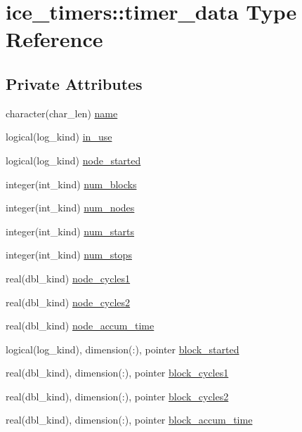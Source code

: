 \hypertarget{typeice__timers_1_1timer__data}{
\section{ice\_\-timers::timer\_\-data Type Reference}
\label{typeice__timers_1_1timer__data}
}
\subsection*{Private Attributes}
\begin{DoxyCompactItemize}
\item 
character(char\_\-len) \hyperlink{typeice__timers_1_1timer__data_a44015dd67659a3714d03f5a79752afc8}{name}
\item 
logical(log\_\-kind) \hyperlink{typeice__timers_1_1timer__data_af1c29a0086c412b4ed465ee606c479ea}{in\_\-use}
\item 
logical(log\_\-kind) \hyperlink{typeice__timers_1_1timer__data_a6a6b881e84dfd7cbfb6ccffd1b1e65a1}{node\_\-started}
\item 
integer(int\_\-kind) \hyperlink{typeice__timers_1_1timer__data_a8a3b41c5452006ccf1ea62b0f47c6246}{num\_\-blocks}
\item 
integer(int\_\-kind) \hyperlink{typeice__timers_1_1timer__data_a385b3c0a0659627b2a96b6fa6c43c96b}{num\_\-nodes}
\item 
integer(int\_\-kind) \hyperlink{typeice__timers_1_1timer__data_a20d814cd89954fa3d7ce9efe689f8ecd}{num\_\-starts}
\item 
integer(int\_\-kind) \hyperlink{typeice__timers_1_1timer__data_a54fa47c05faa9066e575d3a93b495c70}{num\_\-stops}
\item 
real(dbl\_\-kind) \hyperlink{typeice__timers_1_1timer__data_a19ab81d8f8b96be1b52ba66f397061d2}{node\_\-cycles1}
\item 
real(dbl\_\-kind) \hyperlink{typeice__timers_1_1timer__data_acd4bc3626fc916e013bde71bad54be75}{node\_\-cycles2}
\item 
real(dbl\_\-kind) \hyperlink{typeice__timers_1_1timer__data_a31ab30c19c5da159423f352f392fdea7}{node\_\-accum\_\-time}
\item 
logical(log\_\-kind), dimension(:), pointer \hyperlink{typeice__timers_1_1timer__data_a3f8a39f3783f7a747edb805baf5f3f12}{block\_\-started}
\item 
real(dbl\_\-kind), dimension(:), pointer \hyperlink{typeice__timers_1_1timer__data_af720fe0bbaf3a4f78688f8bd3512dfdf}{block\_\-cycles1}
\item 
real(dbl\_\-kind), dimension(:), pointer \hyperlink{typeice__timers_1_1timer__data_a3e77c3fec2569f4bc3d012fe6f3c4dd4}{block\_\-cycles2}
\item 
real(dbl\_\-kind), dimension(:), pointer \hyperlink{typeice__timers_1_1timer__data_aad4925b00e158499fb0b21cc5d08ee9f}{block\_\-accum\_\-time}
\end{DoxyCompactItemize}


